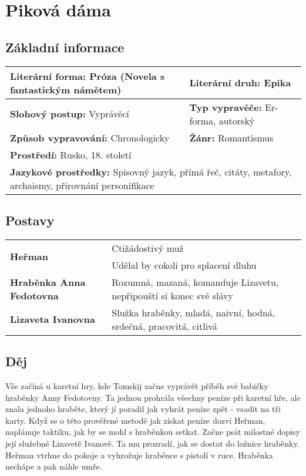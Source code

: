 \section{Piková dáma}
\label{sec:pikovadama}
\subsection*{Základní informace}
\begin{tabularx}{\linewidth}{l|l}
  \textbf{Literární forma:} Próza (Novela s fantastickým námětem) & \textbf{Literární druh:} Epika                                   \\
  \hline
  \textbf{Slohový postup:} Vyprávěcí                              & \textbf{Typ vypravěče:} Er-forma, autorský                       \\
  \hline
  \textbf{Způsob vypravování:} Chronologicky                      & \textbf{Žánr:} Romantismus                                       \\
  \hline
  \multicolumn{2}{l}{\textbf{Prostředí:} Rusko, 18. století}                                                                         \\
  \hline
  \multicolumn{2}{l}{\textbf{Jazykové prostředky:} Spisovný jazyk, přímá řeč, citáty, metafory, archaismy, přirovnání personifikace} \\
\end{tabularx}
\subsection*{Postavy}
\begin{tabularx}{\linewidth}{l|l}
  \multirow{2}{15em}{\textbf{Heřman}} & Ctižádostivý muž                                                    \\
                                      & Udělal by cokoli pro splacení dluhu                                 \\
  \hline
  \textbf{Hraběnka Anna Fedotovna}    & Rozumná, mazaná, komanduje Lizavetu, nepřipouští si konec své slávy \\
  \hline
  \textbf{Lizaveta Ivanovna}          & Služka hraběnky, mladá, naivní, hodná, srdečná, pracovitá, citlivá  \\
\end{tabularx}
\subsection*{Děj}
Vše začíná u karetní hry, kde Tomskij začne vyprávět příběh své babičky hraběnky Anny Fedotovny.
Ta jednou prohrála všechny peníze při karetní hře, ale znala jednoho hraběte, který jí poradil jak vyhrát peníze zpět - vsadit na tři karty.
Když se o této prověřené metodě jak získat peníze dozví Heřman, naplánuje taktiku, jak by se mohl s hraběnkou setkat.
Začne psát milostné dopisy její služebné Lizavetě Ivanově.
Ta mu prozradí, jak se dostat do ložnice hraběnky.
Heřman vtrhne do pokoje a vyhrožuje hraběnce s pistolí v ruce.
Hraběnka nechápe a pak náhle umře.

